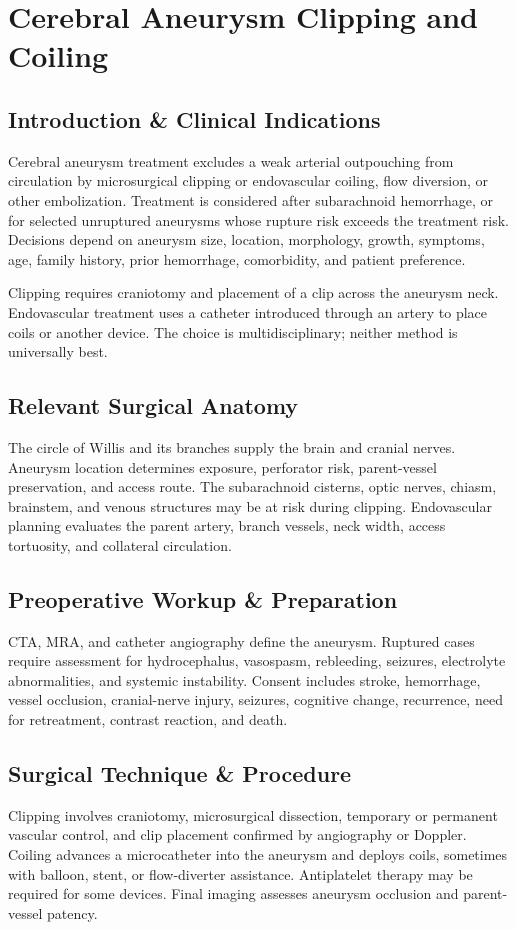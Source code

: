 \chapter{Cerebral Aneurysm Clipping and Coiling}

\section*{Introduction \& Clinical Indications}
Cerebral aneurysm treatment excludes a weak arterial outpouching from circulation by microsurgical clipping or endovascular coiling, flow diversion, or other embolization. Treatment is considered after subarachnoid hemorrhage, or for selected unruptured aneurysms whose rupture risk exceeds the treatment risk. Decisions depend on aneurysm size, location, morphology, growth, symptoms, age, family history, prior hemorrhage, comorbidity, and patient preference.

Clipping requires craniotomy and placement of a clip across the aneurysm neck. Endovascular treatment uses a catheter introduced through an artery to place coils or another device. The choice is multidisciplinary; neither method is universally best.

\section*{Relevant Surgical Anatomy}
The circle of Willis and its branches supply the brain and cranial nerves. Aneurysm location determines exposure, perforator risk, parent-vessel preservation, and access route. The subarachnoid cisterns, optic nerves, chiasm, brainstem, and venous structures may be at risk during clipping. Endovascular planning evaluates the parent artery, branch vessels, neck width, access tortuosity, and collateral circulation.

\section*{Preoperative Workup \& Preparation}
CTA, MRA, and catheter angiography define the aneurysm. Ruptured cases require assessment for hydrocephalus, vasospasm, rebleeding, seizures, electrolyte abnormalities, and systemic instability. Consent includes stroke, hemorrhage, vessel occlusion, cranial-nerve injury, seizures, cognitive change, recurrence, need for retreatment, contrast reaction, and death.

\section*{Surgical Technique \& Procedure}
Clipping involves craniotomy, microsurgical dissection, temporary or permanent vascular control, and clip placement confirmed by angiography or Doppler. Coiling advances a microcatheter into the aneurysm and deploys coils, sometimes with balloon, stent, or flow-diverter assistance. Antiplatelet therapy may be required for some devices. Final imaging assesses aneurysm occlusion and parent-vessel patency.

